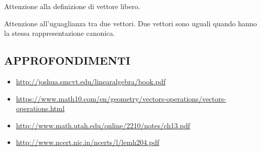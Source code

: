 Attenzione alla definizione di vettore libero.

Attenzione all'uguaglianza tra due vettori. Due vettori sono uguali quando hanno la stessa rappresentazione canonica.

\subsection{APPROFONDIMENTI}
\begin{itemize}
 \item \url{http://joshua.smcvt.edu/linearalgebra/book.pdf}
 \item \url{https://www.math10.com/en/geometry/vectors-operations/vectors-operations.html}
 \item \url{http://www.math.utah.edu/online/2210/notes/ch13.pdf}
 \item \url{http://www.ncert.nic.in/ncerts/l/lemh204.pdf}
\end{itemize}


